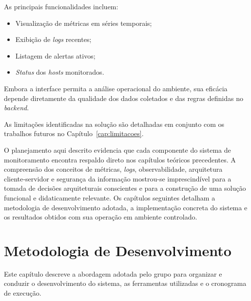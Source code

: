 \documentclass[
    12pt
    ,oneside
    ,a4paper
    ,chapter=TITLE
    ,section=TITLE
    ,sumario=abnt-6027-2012]{abntex2}
\begin{document}
As principais funcionalidades incluem:

\begin{itemize}
    \item Visualização de métricas em séries temporais;
    \item Exibição de \textit{logs} recentes;
    \item Listagem de alertas ativos;
    \item \textit{Status} dos \textit{hosts} monitorados.
\end{itemize}

Embora a interface permita a análise operacional do ambiente, sua eficácia depende diretamente da qualidade dos dados coletados e das regras definidas no \textit{backend}.

As limitações identificadas na solução são detalhadas em conjunto com os trabalhos futuros no Capítulo~\ref{cap:limitacoes}.

O planejamento aqui descrito evidencia que cada componente do sistema de monitoramento encontra respaldo direto nos capítulos teóricos precedentes. A compreensão dos conceitos de métricas, \textit{logs}, observabilidade, arquitetura cliente‑servidor e segurança da informação mostrou-se imprescindível para a tomada de decisões arquiteturais conscientes e para a construção de uma solução funcional e didaticamente relevante. Os capítulos seguintes detalham a metodologia de desenvolvimento adotada, a implementação concreta do sistema e os resultados obtidos com sua operação em ambiente controlado.


\chapter{Metodologia de Desenvolvimento}
\label{cap:metodologia}

Este capítulo descreve a abordagem adotada pelo grupo para organizar e conduzir o desenvolvimento do sistema, as ferramentas utilizadas e o cronograma de execução.
\end{document}
